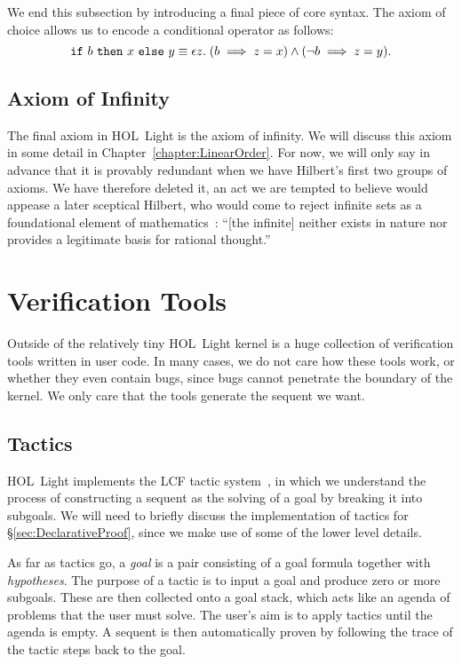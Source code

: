 We end this subsection by introducing a final piece of core syntax. The axiom of choice allows us to encode a conditional operator as follows:
\begin{equation*}
\code{if}\ b\ \code{then}\ x\ \code{else}\ y \equiv \epsilon z.\; (b \implies z = x) \wedge (\neg b \implies z = y) .
\end{equation*}

\subsection{Axiom of Infinity}\label{sec:InfinityDescription}
The final axiom in HOL~Light is the axiom of infinity. We will discuss this axiom in some detail in Chapter~\ref{chapter:LinearOrder}. For now, we will only say in advance that it is provably redundant when we have Hilbert's first two groups of axioms. We have therefore deleted it, an act we are tempted to believe would appease a later sceptical Hilbert, who would come to reject infinite sets as a foundational element of mathematics~\cite{OnInfinite}: ``[the infinite] neither exists in nature nor provides a legitimate basis for rational thought.''

\section{Verification Tools}\label{sec:UserTools}
Outside of the relatively tiny HOL~Light kernel is a huge collection of verification tools written in user code. In many cases, we do not care how these tools work, or whether they even contain bugs, since bugs cannot penetrate the boundary of the kernel. We only care that the tools generate the sequent we want.

\subsection{Tactics}
HOL~Light implements the LCF tactic system~\cite{Tactics}, in which we understand the process of constructing a sequent as the solving of a goal by breaking it into subgoals. We will need to briefly discuss the implementation of tactics for \S\ref{sec:DeclarativeProof}, since we make use of some of the lower level details.

As far as tactics go, a \emph{goal} is a pair consisting of a goal formula together with \emph{hypotheses}. The purpose of a tactic is to input a goal and produce zero or more subgoals. These are then collected onto a goal stack, which acts like an agenda of problems that the user must solve. The user's aim is to apply tactics until the agenda is empty. A sequent is then automatically proven by following the trace of the tactic steps back to the goal.

